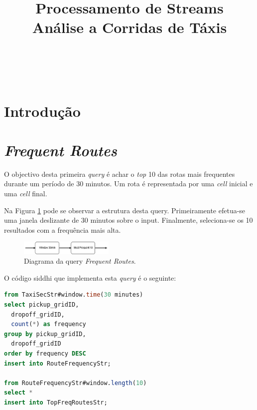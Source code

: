 \documentclass[article]{IEEEtran}
\begin{document}
\title{Processamento de Streams\\Análise a Corridas de Táxis}


\author{\\
\and
{}\\
}

\maketitle



\section{Introdução}

\section{\textit{Frequent Routes}}

O objectivo desta primeira \textit{query} é achar o \textit{top} 10 das rotas mais frequentes durante um período de 30 minutos. Um rota é representada por uma \textit{cell} inicial e uma \textit{cell} final.

Na Figura \ref{fig:frequentRoutesDiagram} pode se observar a estrutura desta query. Primeiramente efetua-se uma janela deslizante de 30 minutos sobre o input. Finalmente, seleciona-se os 10 resultados com a frequência mais alta.

\begin{figure}[hbtp]
    \centering
        \includegraphics[width=0.4\textwidth]{images/frequentRoutesDiagram}
    \caption{Diagrama da query \textit{Frequent Routes}.}
    \label{fig:frequentRoutesDiagram}
\end{figure}

O código siddhi que implementa esta \textit{query} é o seguinte:

\begin{lstlisting}[language=SQL]
from TaxiSecStr#window.time(30 minutes)
select pickup_gridID,
  dropoff_gridID,
  count(*) as frequency
group by pickup_gridID,
  dropoff_gridID
order by frequency DESC
insert into RouteFrequencyStr;

from RouteFrequencyStr#window.length(10)
select *
insert into TopFreqRoutesStr;
\end{lstlisting}
\end{document}
